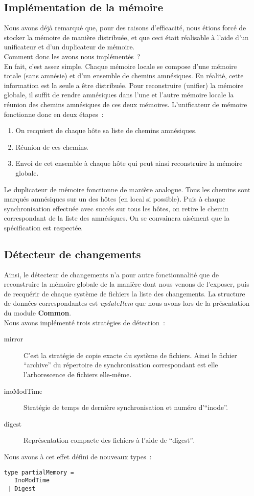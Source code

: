 \documentclass[11pt]{report}
\newcommand{\data}[1]{\emph{#1}}
\newcommand{\modu}[1]{\textbf{#1}}
\begin{document}
{\subsection{Impl\'ementation de la m\'emoire}
Nous avons d\'ej\`a remarqu\'e que, pour des raisons d'efficacit\'e, nous \'etions
forc\'e de stocker la m\'emoire de mani\`ere distribu\'ee, et que ceci \'etait 
r\'ealisable \`a l'aide d'un unificateur et d'un duplicateur de m\'emoire.\\
Comment donc les avons nous impl\'ement\'es~?\\
En fait, c'est assez simple. Chaque m\'emoire locale se compose d'une m\'emoire totale
(sans amn\'esie) et d'un ensemble de chemins amn\'esiques. En r\'ealit\'e, cette information
est la seule a \^etre distribu\'ee. Pour reconstruire (unifier) la m\'emoire globale, il
suffit de rendre amn\'esiques dans l'une et l'autre m\'emoire locale la r\'eunion des chemins
amn\'esiques de ces deux m\'emoires. L'unificateur de m\'emoire fonctionne donc en deux \'etapes~:
\begin{enumerate}
\item On recquiert de chaque h\^ote sa liste de chemins amn\'esiques.
\item R\'eunion de ces chemins.
\item Envoi de cet ensemble \`a chaque h\^ote qui peut ainsi reconstruire la m\'emoire globale.
\end{enumerate}
Le duplicateur de m\'emoire fonctionne de mani\`ere analogue. Tous les chemins sont marqu\'es 
amn\'esiques sur un des h\^otes (en local si possible). Puis \`a chaque synchronisation 
effectu\'ee avec succ\'es sur tous les h\^otes, on retire le chemin correspondant de la liste 
des amn\'esiques. On se convaincra ais\'ement que la sp\'ecification est respect\'ee.
\subsection{D\'etecteur de changements}
Ainsi, le d\'etecteur de changements n'a pour autre fonctionnalit\'e que de reconstruire la 
m\'emoire globale de la mani\`ere dont nous venons de l'exposer, puis de 
recqu\'erir de chaque syst\`eme de fichiers la liste des changements. 
La structure de donn\'ees correspondantes est \data{updateItem} que nous avons
lors de la pr\'esentation du module \modu{Common}.\\
Nous avons impl\'ement\'e trois strat\'egies de d\'etection~:
\begin{description}
\item [mirror] C'est la strat\'egie de copie exacte du syst\`eme de fichiers. Ainsi le fichier
``archive'' du r\'epertoire de synchronisation correspondant est elle l'arborescence de fichiers
elle-m\^eme.
\item [inoModTime] Strat\'egie de temps de derni\`ere synchronisation et num\'ero d'``inode''.
\item [digest] Repr\'esentation compacte des fichiers \`a l'aide de ``digest''.
\end{description}
Nous avons \`a cet effet d\'efini de nouveaux types~:
\begin{verbatim}
type partialMemory =
   InoModTime
 | Digest


\end{verbatim}}
\end{document}
